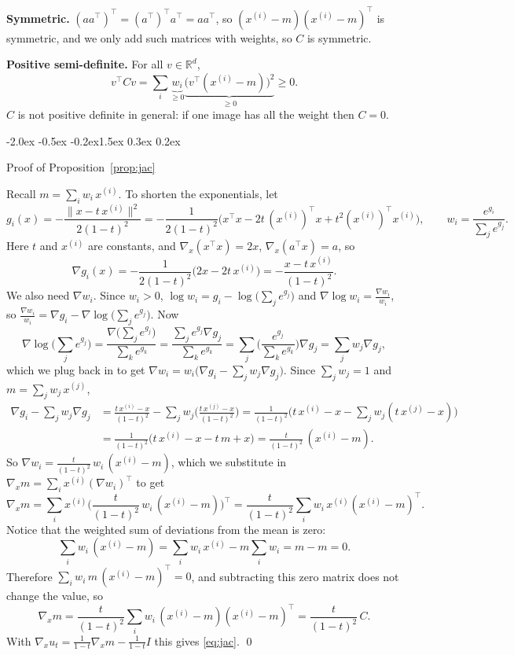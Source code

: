 \documentclass{article}
\makeatletter
\renewcommand{\section}{\@startsection{section}{1}{\z@}%
  {-2.0ex \@plus -0.5ex \@minus -0.2ex}{1.5ex \@plus 0.3ex \@minus 0.2ex}{\large\bfseries\raggedright}}
\theoremstyle{remark}
\newcommand{\R}{\mathbb{R}}
\newcommand{\xn}[1]{x^{(#1)}}
\makeatother
\begin{document}
\textbf{Symmetric.} $(aa^\top)^\top = (a^\top)^\top a^\top = aa^\top$, so $(\xn{i} - m)(\xn{i} - m)^\top$ is symmetric, and we only add such matrices with weights, so $C$ is symmetric.

\textbf{Positive semi-definite.} For all $v \in \R^d$,
\[
  v^\top Cv = \sum_i\underbrace{w_i}_{\ge 0}\underbrace{\big(v^\top(\xn{i} - m)\big)^2}_{\ge 0} \ge 0 .
\]
$C$ is not positive definite in general: if one image has all the weight then $C = 0$.

\section{Proof of Proposition~\ref{prop:jac}}\label{app:jac}

Recall $m = \sum_iw_i\,\xn{i}$. To shorten the exponentials, let
\[
  g_i(x) = -\frac{\|x - t\,\xn{i}\|^2}{2(1 - t)^2}
  = -\frac{1}{2(1 - t)^2}\Big(x^\top x - 2t\,(\xn{i})^\top x + t^2(\xn{i})^\top\xn{i}\Big),
  \qquad w_i = \frac{e^{g_i}}{\sum_je^{g_j}} .
\]
Here $t$ and $\xn{i}$ are constants, and $\nabla_x(x^\top x) = 2x$, $\nabla_x(a^\top x) = a$, so
\[
  \nabla g_i(x) = -\frac{1}{2(1 - t)^2}\big(2x - 2t\,\xn{i}\big) = -\frac{x - t\,\xn{i}}{(1 - t)^2}.
\]
We also need $\nabla w_i$. Since $w_i > 0$, $\log w_i = g_i - \log\big(\sum_je^{g_j}\big)$ and $\nabla\log w_i = \frac{\nabla w_i}{w_i}$, so $\frac{\nabla w_i}{w_i} = \nabla g_i - \nabla\log\big(\sum_je^{g_j}\big)$. Now
\[
  \nabla\log\Big(\sum_je^{g_j}\Big) = \frac{\nabla\big(\sum_je^{g_j}\big)}{\sum_ke^{g_k}}
  = \frac{\sum_je^{g_j}\nabla g_j}{\sum_ke^{g_k}}
  = \sum_j\Big(\frac{e^{g_j}}{\sum_ke^{g_k}}\Big)\nabla g_j = \sum_jw_j\nabla g_j,
\]
which we plug back in to get $\nabla w_i = w_i\big(\nabla g_i - \sum_jw_j\nabla g_j\big)$. Since $\sum_jw_j = 1$ and $m = \sum_jw_j\,\xn{j}$,
\begin{align*}
  \nabla g_i - \sum_jw_j\nabla g_j
  &= \frac{t\,\xn{i} - x}{(1 - t)^2} - \sum_jw_j\Big(\frac{t\,\xn{j} - x}{(1 - t)^2}\Big)
   = \frac{1}{(1 - t)^2}\Big(t\,\xn{i} - x - \sum_jw_j(t\,\xn{j} - x)\Big)\\
  &= \frac{1}{(1 - t)^2}\big(t\,\xn{i} - x - t\,m + x\big) = \frac{t}{(1 - t)^2}\,(\xn{i} - m).
\end{align*}
So $\nabla w_i = \frac{t}{(1 - t)^2}\,w_i\,(\xn{i} - m)$, which we substitute in $\nabla_xm = \sum_i\xn{i}(\nabla w_i)^\top$ to get
\[
  \nabla_xm = \sum_i\xn{i}\Big(\frac{t}{(1 - t)^2}\,w_i\,(\xn{i} - m)\Big)^\top
  = \frac{t}{(1 - t)^2}\sum_iw_i\,\xn{i}(\xn{i} - m)^\top .
\]
Notice that the weighted sum of deviations from the mean is zero:
\[
  \sum_iw_i\,(\xn{i} - m) = \sum_iw_i\,\xn{i} - m\sum_iw_i = m - m = 0 .
\]
Therefore $\sum_iw_i\,m\,(\xn{i} - m)^\top = 0$, and subtracting this zero matrix does not change the value, so
\[
  \nabla_xm = \frac{t}{(1 - t)^2}\sum_iw_i\,(\xn{i} - m)(\xn{i} - m)^\top = \frac{t}{(1 - t)^2}\,C .
\]
With $\nabla_xu_t = \frac{1}{1 - t}\nabla_xm - \frac{1}{1 - t}I$ this gives \eqref{eq:jac}. \qed
\end{document}
